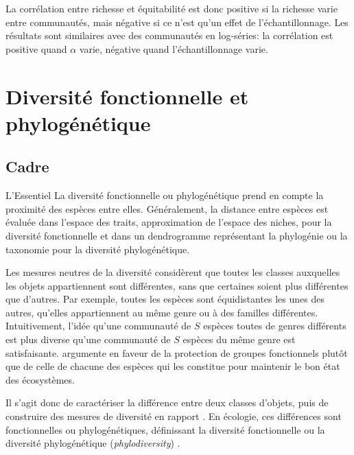 \documentclass[
  11pt,
  french,
  a4paper,
  extrafontsizes,onecolumn,openright
  ]{memoir}
\newenvironment{Summary}
  {\begin{bclogo}[logo=\bctrombone, noborder=true, couleur=lightgray!50]{L'Essentiel}\parindent0pt}
  {\end{bclogo}}
\begin{document}
\normalsize

La corrélation entre richesse et équitabilité est donc positive si la richesse varie entre communautés, mais négative si ce n'est qu'un effet de l'échantillonnage.
Les résultats sont similaires avec des communautés en log-séries: la corrélation est positive quand \(\alpha\) varie, négative quand l'échantillonnage varie.

\hypertarget{part-diversituxe9-fonctionnelle-et-phyloguxe9nuxe9tique}{%
\part{Diversité fonctionnelle et phylogénétique}\label{part-diversituxe9-fonctionnelle-et-phyloguxe9nuxe9tique}}

\hypertarget{cadre}{%
\chapter{Cadre}\label{cadre}}

\scriptsize

\normalsize

\scriptsize

\begin{Summary}
La diversité fonctionnelle ou phylogénétique prend en compte la
proximité des espèces entre elles. Généralement, la distance entre
espèces est évaluée dans l'espace des traits, approximation de l'espace
des niches, pour la diversité fonctionnelle et dans un dendrogramme
représentant la phylogénie ou la taxonomie pour la diversité
phylogénétique.
\end{Summary}

\normalsize

Les mesures neutres de la diversité considèrent que toutes les classes auxquelles les objets appartiennent sont différentes, sans que certaines soient plus différentes que d'autres.
Par exemple, toutes les espèces sont équidistantes les unes des autres, qu'elles appartiennent au même genre ou à des familles différentes.
Intuitivement, l'idée qu'une communauté de \(S\) espèces toutes de genres différents est plus diverse qu'une communauté de \(S\) espèces du même genre est satisfaisante.
\textcite{Walker1992} argumente en faveur de la protection de groupes fonctionnels plutôt que de celle de chacune des espèces qui les constitue pour maintenir le bon état des écosystèmes.

Il s'agit donc de caractériser la différence entre deux classes d'objets, puis de construire des mesures de diversité en rapport \autocite{Pielou1975,May1990a,Cousins1991}.
En écologie, ces différences sont fonctionnelles ou phylogénétiques, définissant la diversité fonctionnelle \autocite{Tilman1997} ou la diversité phylogénétique (\emph{phylodiversity}) \autocite{Webb2006}.
\end{document}
